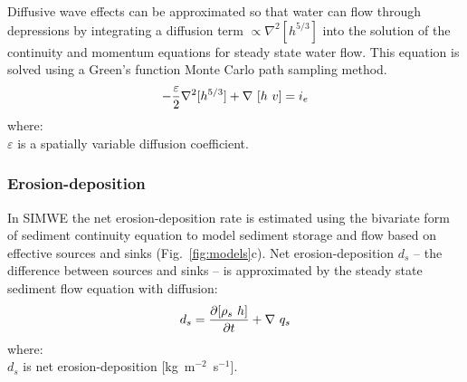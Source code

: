 \documentclass[gmd, manuscript]{copernicus}
\begin{document}
\noindent
Diffusive wave effects can be approximated
so that water can flow through depressions 
by integrating a diffusion term 
$ \propto \nabla^2 [h^{5/3}]$
into the solution of the continuity and momentum equations 
for steady state water flow.
This equation is solved using a 
Green's function Monte Carlo path sampling method. 
\begin{equation}
\label{eq:difwater}
-{\varepsilon\over 2 }\nabla^2 [h^{5/3}]
+\nabla ~ [ h~v] = i_e
\end{equation}
{\small
\noindent
 where: \\
 \noindent
 \hspace*{0.5em} $\varepsilon$ is a spatially variable diffusion coefficient. \\
}


\subsubsection{Erosion-deposition}



In SIMWE 
the net erosion-deposition rate is estimated
using the bivariate form of sediment continuity equation
to model sediment storage and flow 
based on effective sources and sinks
(Fig.~\ref{fig:models}c). 
Net erosion-deposition $d_s$
-- the difference between sources and sinks --
is approximated by
the steady state sediment flow equation with diffusion:
\begin{equation}\label{eq:sediment} 
d_s = 
{\partial [\rho_s ~ h] \over \partial t} +
\nabla~q_s
\end{equation}
{\small
\noindent
where: \\
\hspace*{0.5em} $d_s$ is net erosion-deposition [\unit{kg~m}$^{-2}$~\unit{s}$^{-1}$].\\
}
\end{document}
